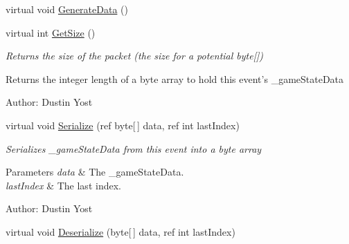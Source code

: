\begin{DoxyCompactItemize}
\item 
virtual void \hyperlink{class_skyrates_1_1_common_1_1_entity_1_1_entity_tracker_a4ede7aaa958e764abcf7404c780457f4}{Generate\-Data} ()
\item 
\hypertarget{class_skyrates_1_1_common_1_1_entity_1_1_entity_tracker_a1d51788798accc30939140c1b08c9e0e}{virtual int \hyperlink{class_skyrates_1_1_common_1_1_entity_1_1_entity_tracker_a1d51788798accc30939140c1b08c9e0e}{Get\-Size} ()}\label{class_skyrates_1_1_common_1_1_entity_1_1_entity_tracker_a1d51788798accc30939140c1b08c9e0e}

\begin{DoxyCompactList}\small\item\em Returns the size of the packet (the size for a potential byte\mbox{[}\mbox{]}) 

\begin{DoxyReturn}{Returns}
the integer length of a byte array to hold this event's \-\_\-game\-State\-Data 
\end{DoxyReturn}


Author\-: Dustin Yost  \end{DoxyCompactList}\item 
\hypertarget{class_skyrates_1_1_common_1_1_entity_1_1_entity_tracker_a7f4a7f9b73609b7f9fc38f2ef1a94cfe}{virtual void \hyperlink{class_skyrates_1_1_common_1_1_entity_1_1_entity_tracker_a7f4a7f9b73609b7f9fc38f2ef1a94cfe}{Serialize} (ref byte\mbox{[}$\,$\mbox{]} data, ref int last\-Index)}\label{class_skyrates_1_1_common_1_1_entity_1_1_entity_tracker_a7f4a7f9b73609b7f9fc38f2ef1a94cfe}

\begin{DoxyCompactList}\small\item\em Serializes \-\_\-game\-State\-Data from this event into a byte array 


\begin{DoxyParams}{Parameters}
{\em data} & The \-\_\-game\-State\-Data.\\
\hline
{\em last\-Index} & The last index.\\
\hline
\end{DoxyParams}


Author\-: Dustin Yost  \end{DoxyCompactList}\item 
\hypertarget{class_skyrates_1_1_common_1_1_entity_1_1_entity_tracker_abca7ae5aba960e5bfc2a0fcd5cb65f74}{virtual void \hyperlink{class_skyrates_1_1_common_1_1_entity_1_1_entity_tracker_abca7ae5aba960e5bfc2a0fcd5cb65f74}{Deserialize} (byte\mbox{[}$\,$\mbox{]} data, ref int last\-Index)}\label{class_skyrates_1_1_common_1_1_entity_1_1_entity_tracker_abca7ae5aba960e5bfc2a0fcd5cb65f74}


\end{DoxyCompactItemize}
